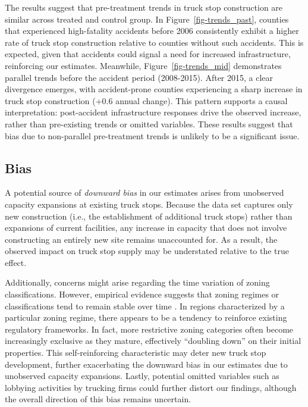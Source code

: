 \documentclass[
  8pt,
  12pt]{article}
\begin{document}
The results suggest that pre-treatment trends in truck stop construction
are similar across treated and control group. In
Figure~\ref{fig-trends_past}, counties that experienced high-fatality
accidents before 2006 consistently exhibit a higher rate of truck stop
construction relative to counties without such accidents. This is
expected, given that accidents could signal a need for increased
infrastructure, reinforcing our estimates. Meanwhile,
Figure~\ref{fig-trends_mid} demonstrates parallel trends before the
accident period (2008-2015). After 2015, a clear divergence emerges,
with accident-prone counties experiencing a sharp increase in truck stop
construction (+0.6 annual change). This pattern supports a causal
interpretation: post-accident infrastructure responses drive the
observed increase, rather than pre-existing trends or omitted variables.
These results suggest that bias due to non-parallel pre-treatment trends
is unlikely to be a significant issue.

\subsection{Bias}\label{bias}

A potential source of \emph{downward bias} in our estimates arises from
unobserved capacity expansions at existing truck stops. Because the data
set captures only new construction (i.e., the establishment of
additional truck stops) rather than expansions of current facilities,
any increase in capacity that does not involve constructing an entirely
new site remains unaccounted for. As a result, the observed impact on
truck stop supply may be understated relative to the true effect.

Additionally, concerns might arise regarding the time variation of
zoning classifications. However, empirical evidence suggests that zoning
regimes or classifications tend to remain stable over time
\citep{mclaughlinLandUseRegulation2012}. In regions characterized by a
particular zoning regime, there appears to be a tendency to reinforce
existing regulatory frameworks. In fact, more restrictive zoning
categories often become increasingly exclusive as they mature,
effectively ``doubling down'' on their initial properties. This
self-reinforcing characteristic may deter new truck stop development,
further exacerbating the downward bias in our estimates due to
unobserved capacity expansions. Lastly, potential omitted variables such
as lobbying activities by trucking firms could further distort our
findings, although the overall direction of this bias remains uncertain.
\end{document}
